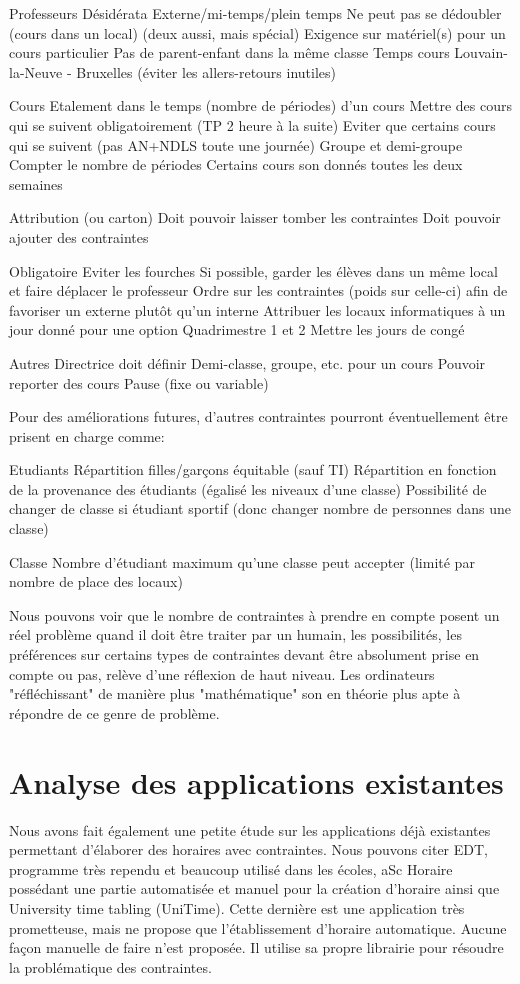 Professeurs
Désidérata
Externe/mi-temps/plein temps
Ne peut pas se dédoubler (cours dans un local) (deux aussi, mais spécial)
Exigence sur matériel(s) pour un cours particulier
Pas de parent-enfant dans la même classe
Temps cours Louvain-la-Neuve - Bruxelles (éviter les allers-retours inutiles)

Cours
Etalement dans le temps (nombre de périodes) d'un cours
Mettre des cours qui se suivent obligatoirement (TP 2 heure à la suite)
Eviter que certains cours qui se suivent (pas AN+NDLS toute une journée)
Groupe et demi-groupe
Compter le nombre de périodes
Certains cours son donnés toutes les deux semaines



Attribution (ou carton)
Doit pouvoir laisser tomber les contraintes
Doit pouvoir ajouter des contraintes

Obligatoire
Eviter les fourches
Si possible, garder les élèves dans un même local et faire déplacer le professeur
Ordre sur les contraintes (poids sur celle-ci) afin de favoriser un externe plutôt qu'un interne
Attribuer les locaux informatiques à un jour donné pour une option
Quadrimestre 1 et 2
Mettre les jours de congé

Autres
Directrice doit définir Demi-classe, groupe, etc. pour un cours
Pouvoir reporter des cours
Pause (fixe ou variable)

Pour des améliorations futures, d'autres contraintes pourront éventuellement être prisent en charge comme:

Etudiants
Répartition filles/garçons équitable (sauf TI)
Répartition en fonction de la provenance des étudiants (égalisé les niveaux d'une classe)
Possibilité de changer de classe si étudiant sportif (donc changer nombre de personnes dans une classe)

Classe
Nombre d'étudiant maximum qu'une classe peut accepter (limité par nombre de place des locaux)

Nous pouvons voir que le nombre de contraintes à prendre en compte posent un réel problème quand il doit être traiter par un humain, les possibilités, les préférences sur certains types de contraintes devant être absolument prise en compte ou pas, relève d'une réflexion de haut niveau. Les ordinateurs "réfléchissant" de manière plus "mathématique" son en théorie plus apte à répondre de ce genre de problème.

\section{Analyse des applications existantes}
Nous avons fait également une petite étude sur les applications déjà existantes permettant d'élaborer des horaires avec contraintes. Nous pouvons citer EDT, programme très rependu et beaucoup utilisé dans les écoles, aSc Horaire possédant une partie automatisée et manuel pour la création d'horaire ainsi que University time tabling (UniTime). Cette dernière est une application très prometteuse, mais ne propose que l'établissement d'horaire automatique. Aucune façon manuelle de faire n'est proposée. Il utilise sa propre librairie pour résoudre la problématique des contraintes.

